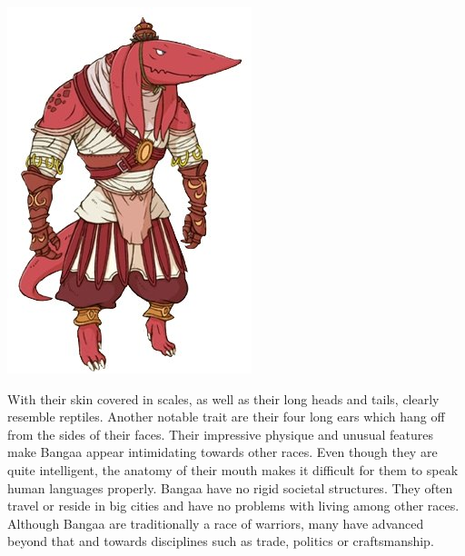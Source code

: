 %
\clearpage
%
%
%
\begin{center} \includegraphics[width=0.88\columnwidth]{./art/races/bangaa.jpg} \end{center}
%
With their skin covered in scales, as well as their long heads and tails,  clearly resemble reptiles.
Another notable trait are their four long ears which hang off from the sides of their faces.
Their impressive physique and unusual features make Bangaa appear intimidating towards other races.
Even though they are quite intelligent, the anatomy of their mouth makes it difficult for them to speak human languages properly.
Bangaa have no rigid societal structures.
They often travel or reside in big cities and have no problems with living among other races. 
Although Bangaa are traditionally a race of warriors, many have advanced beyond that and towards disciplines such as trade, politics or craftsmanship.
